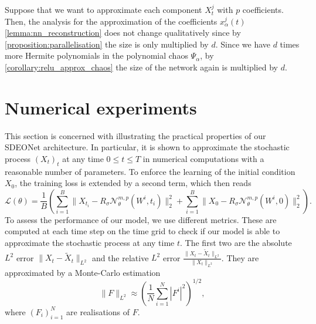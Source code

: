 \documentclass[12pt]{article}
\theoremstyle{remark}
\theoremstyle{plain}
\numberwithin{equation}{section}
\begin{document}
Suppose that we want to approximate each component $X_t^j$ with $p$ coefficients.
Then, the analysis for the approximation of the coefficients $x_\alpha^j(t)$ \cref{lemma:nn_reconstruction} does not change qualitatively since by \cref{proposition:parallelisation} the size is only multiplied by $d$.
Since we have $d$ times more Hermite polynomials in the polynomial chaos $\Psi_\alpha$, by \cref{corollary:relu_approx_chaos} the size of the network again is multiplied by $d$.
\section{Numerical experiments}
\label{sec:experiments}

This section is concerned with illustrating the practical properties of our SDEONet architecture.
In particular, it is shown to approximate the stochastic process $(X_t)_t$ at any time $0\leq t\leq T$ in numerical computations with a reasonable number of parameters.
%
To enforce the learning of the initial condition $X_0$, the training loss is extended by a second term, which then reads
\begin{equation}
    \mathcal L(\theta) = \frac 1 B \left(\sum_{i=1}^B \|X_{t_i}-R_\sigma \mathcal N_\theta^{m,p}(W^i, t_i)\|_2^2 + \sum_{i=1}^B \|X_0 - R_\sigma \mathcal N_\theta^{m,p}(W^i, 0)\|_2^2\right).
    \label{eq:loss}
\end{equation}
To assess the performance of our model, we use different metrics.
These are computed at each time step on the time grid to check if our model is able to approximate the stochastic process at any time $t$.
The first two are the absolute $L^2$ error $\|X_t - \tilde X_t\|_{L^2}$ and the relative $L^2$ error $\frac{\|X_t - \tilde X_t\|_{L^2}}{\|X_t\|_{L^2}}$.
They are approximated by a Monte-Carlo estimation
\begin{equation*}
    \|F\|_{L^2} \approx \left(\frac 1 N \sum_{i=1}^N |F^i|^2\right)^{1/2},
\end{equation*}
where $(F_i)_{i=1}^N$ are realisations of $F$.
\end{document}
